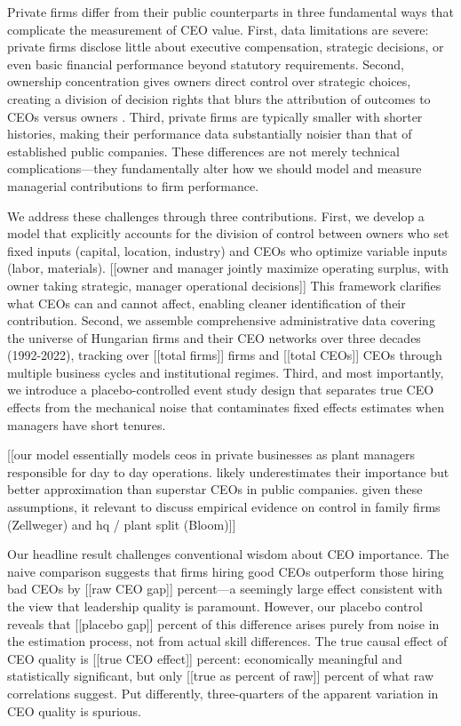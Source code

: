 \documentclass[11pt,a4paper]{article}
\begin{document}
Private firms differ from their public counterparts in three fundamental ways that complicate the measurement of CEO value. First, data limitations are severe: private firms disclose little about executive compensation, strategic decisions, or even basic financial performance beyond statutory requirements. Second, ownership concentration gives owners direct control over strategic choices, creating a division of decision rights that blurs the attribution of outcomes to CEOs versus owners \citep{fama1983separation, jensen1976theory, burkart2003family}. Third, private firms are typically smaller with shorter histories, making their performance data substantially noisier than that of established public companies. These differences are not merely technical complications—they fundamentally alter how we should model and measure managerial contributions to firm performance.

We address these challenges through three contributions. First, we develop a model that explicitly accounts for the division of control between owners who set fixed inputs (capital, location, industry) and CEOs who optimize variable inputs (labor, materials). [[owner and manager jointly maximize operating surplus, with owner taking strategic, manager operational decisions]] This framework clarifies what CEOs can and cannot affect, enabling cleaner identification of their contribution. Second, we assemble comprehensive administrative data covering the universe of Hungarian firms and their CEO networks over three decades (1992-2022), tracking over [[total firms]] firms and [[total CEOs]] CEOs through multiple business cycles and institutional regimes. Third, and most importantly, we introduce a placebo-controlled event study design that separates true CEO effects from the mechanical noise that contaminates fixed effects estimates when managers have short tenures.

[[our model essentially models ceos in private businesses as plant managers responsible for day to day operations. likely underestimates their importance but better approximation than superstar CEOs in public companies. given these assumptions, it relevant to discuss empirical evidence on control in family firms (Zellweger) and hq / plant split (Bloom)]]

Our headline result challenges conventional wisdom about CEO importance. The naive comparison suggests that firms hiring good CEOs outperform those hiring bad CEOs by [[raw CEO gap]] percent—a seemingly large effect consistent with the view that leadership quality is paramount. However, our placebo control reveals that [[placebo gap]] percent of this difference arises purely from noise in the estimation process, not from actual skill differences. The true causal effect of CEO quality is [[true CEO effect]] percent: economically meaningful and statistically significant, but only [[true as percent of raw]] percent of what raw correlations suggest. Put differently, three-quarters of the apparent variation in CEO quality is spurious.
\end{document}
